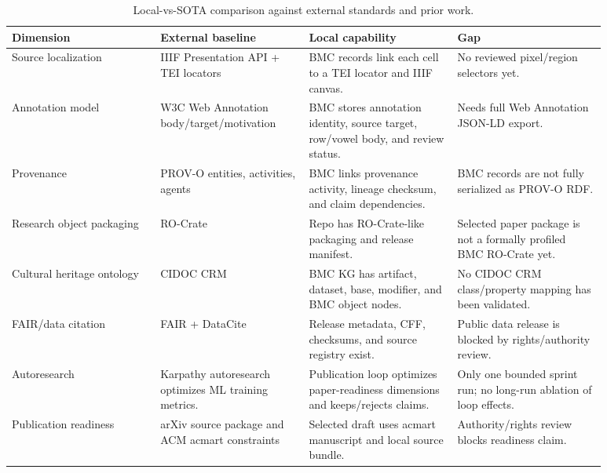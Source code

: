 \begin{table}[t]
\caption{Local-vs-SOTA comparison against external standards and prior work.}
\label{tab:local-sota}
\small
\begin{tabular}{|p{0.22\linewidth}|p{0.22\linewidth}|p{0.22\linewidth}|p{0.22\linewidth}|}
\hline
Dimension & External baseline & Local capability & Gap \\
\hline
Source localization & IIIF Presentation API + TEI locators & BMC records link each cell to a TEI locator and IIIF canvas. & No reviewed pixel/region selectors yet. \\
Annotation model & W3C Web Annotation body/target/motivation & BMC stores annotation identity, source target, row/vowel body, and review status. & Needs full Web Annotation JSON-LD export. \\
Provenance & PROV-O entities, activities, agents & BMC links provenance activity, lineage checksum, and claim dependencies. & BMC records are not fully serialized as PROV-O RDF. \\
Research object packaging & RO-Crate & Repo has RO-Crate-like packaging and release manifest. & Selected paper package is not a formally profiled BMC RO-Crate yet. \\
Cultural heritage ontology & CIDOC CRM & BMC KG has artifact, dataset, base, modifier, and BMC object nodes. & No CIDOC CRM class/property mapping has been validated. \\
FAIR/data citation & FAIR + DataCite & Release metadata, CFF, checksums, and source registry exist. & Public data release is blocked by rights/authority review. \\
Autoresearch & Karpathy autoresearch optimizes ML training metrics. & Publication loop optimizes paper-readiness dimensions and keeps/rejects claims. & Only one bounded sprint run; no long-run ablation of loop effects. \\
Publication readiness & arXiv source package and ACM acmart constraints & Selected draft uses acmart manuscript and local source bundle. & Authority/rights review blocks readiness claim. \\
\hline
\end{tabular}
\end{table}
